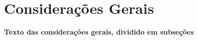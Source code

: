 \chapter{Considerações Gerais}
\label{cap:02}

\textbf{Texto das considerações gerais, dividido em subseções}




%
%


% 




